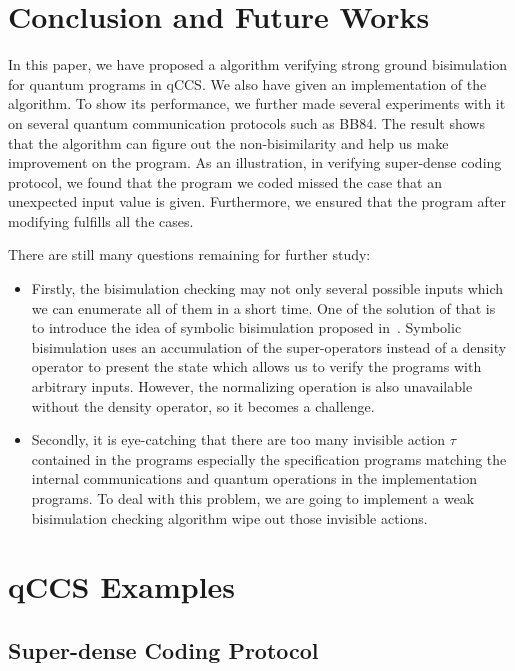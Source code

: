 \documentclass[a4paper,UKenglish,cleveref, autoref]{lipics-v2019}
\begin{document}
\section{Conclusion and Future Works}
In this paper, we have proposed a algorithm  verifying strong ground bisimulation for quantum programs in qCCS. We also have given an implementation of the algorithm. To show its performance, we further made several experiments with it on several quantum communication protocols such as BB84. The result shows that the algorithm can figure out the non-bisimilarity and help us make improvement on the program. As an illustration, in verifying super-dense coding protocol, we found that the program we coded missed the case that an unexpected input value is given. Furthermore, we ensured that the program after modifying fulfills all the cases.

There are still many questions remaining for further study:
\begin{itemize}
    \item Firstly, the bisimulation checking may not only several possible inputs which we can enumerate all of them in a short time. One of the solution of that is to introduce the idea of symbolic bisimulation proposed in~\cite{FDY14}. Symbolic bisimulation uses an accumulation of the super-operators instead of a density operator to present the state which allows us to verify the programs with arbitrary inputs. However, the normalizing operation is also unavailable without the density operator, so it becomes a challenge.
    \item Secondly, it is eye-catching that there are too many invisible action $\tau$ contained in the programs especially the specification programs matching the internal communications and quantum operations in the implementation programs. To deal with this problem, we are going to implement a weak bisimulation checking algorithm wipe out those invisible actions. 
\end{itemize}






\appendix

\section{qCCS Examples}
\subsection{Super-dense Coding Protocol}
\end{document}
